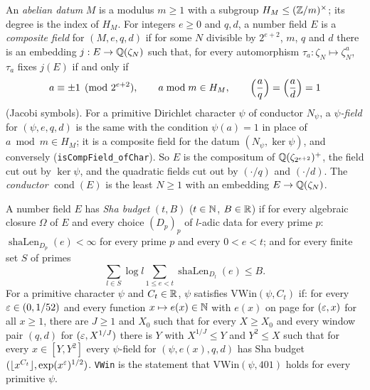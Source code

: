 \begin{definition}\label{sha:fields}
An \emph{abelian datum} $M$ is a modulus $m\ge1$ with a subgroup
$H_M\le(\mathbb{Z}/m)^{\times}$; its degree is the index of $H_M$. For integers $e\ge0$ and
$q,d$, a number field $E$ is a \emph{composite field} for $(M,e,q,d)$ if for some $N$
divisible by $2^{e+2}$, $m$, $q$ and $d$ there is an embedding
$j:E\to\mathbb{Q}(\zeta_N)$ such that, for every automorphism $\tau_a:\zeta_N\mapsto\zeta_N^a$,
$\tau_a$ fixes $j(E)$ if and only if
\[
a\equiv\pm1\pmod{2^{e+2}},\qquad a\bmod m\in H_M,\qquad
\Bigl(\frac aq\Bigr)=\Bigl(\frac ad\Bigr)=1
\]
(Jacobi symbols). For a primitive Dirichlet character $\psi$ of conductor $N_{\psi}$, a
\emph{$\psi$-field} for $(\psi,e,q,d)$ is the same with the condition $\psi(a)=1$ in place
of $a\bmod m\in H_M$; it is a composite field for the datum
$(N_{\psi},\ker\psi)$, and conversely (\texttt{isCompField\_ofChar}). So $E$ is the
compositum of $\mathbb{Q}(\zeta_{2^{e+2}})^+$, the field cut out by $\ker\psi$, and the
quadratic fields cut out by $(\cdot/q)$ and $(\cdot/d)$. The \emph{conductor}
$\operatorname{cond}(E)$ is the least $N\ge1$ with an embedding $E\to\mathbb{Q}(\zeta_N)$.
\end{definition}



\begin{definition}\label{sha:vwin}
A number field $E$ has \emph{Sha budget} $(t,B)$ ($t\in\mathbb{N}$, $B\in\mathbb{R}$) if for every
algebraic closure $\Omega$ of $E$ and every choice $(D_p)_p$ of $l$-adic data for every
prime $p$: $\operatorname{shaLen}_{D_p}(e)<\infty$ for every prime $p$ and every
$0<e<t$; and for every finite set $S$ of primes
\[
\sum_{l\in S}\log l\sum_{1\le e<t}\operatorname{shaLen}_{D_l}(e)\le B .
\]
For a primitive character $\psi$ and $C_t\in\mathbb{R}$, $\psi$ satisfies $\mathrm{VWin}(\psi,C_t)$
if: for every $\varepsilon\in(0,1/52)$ and every function $x\mapsto e(x)\in\mathbb{N}$ with $e(x)$ on page
for $(\varepsilon,x)$ for all $x\ge1$, there are $J\ge1$ and $X_0$ such that for every
$X\ge X_0$ and every window pair $(q,d)$ for $(\varepsilon,X^{1/J})$ there is $Y$ with
$X^{1/J}\le Y$ and $Y^2\le X$ such that for every $x\in[Y,Y^2]$ every $\psi$-field for
$(\psi,e(x),q,d)$ has Sha budget $(\lfloor x^{C_t}\rfloor,\exp(x^{\varepsilon})^{1/2})$.
\texttt{VWin} is the statement that $\mathrm{VWin}(\psi,401)$ holds for every primitive
$\psi$.
\end{definition}

